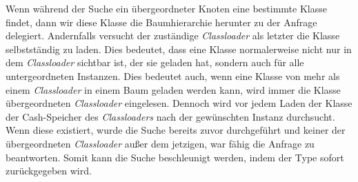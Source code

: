     Wenn während der Suche ein übergeordneter Knoten eine bestimmte Klasse findet, dann wir diese Klasse die Baumhierarchie herunter zu der Anfrage delegiert. Andernfalls versucht der zuständige \textit{Classloader} als letzter die Klasse selbstständig zu laden.
    Dies bedeutet, dass eine Klasse normalerweise nicht nur in dem \textit{Classloader} sichtbar ist, der sie geladen hat, sondern auch für alle untergeordneten Instanzen. Dies bedeutet auch, wenn eine Klasse von mehr als einem \textit{Classloader} in einem Baum geladen werden kann, wird immer die Klasse übergeordneten \textit{Classloader} eingelesen. \newline
    Dennoch wird vor jedem Laden der Klasse der Cash-Speicher des \textit{Classloaders} nach der gewünschten Instanz durchsucht. Wenn diese existiert, wurde die Suche bereits zuvor durchgeführt und keiner der übergeordneten \textit{Classloader} außer dem jetzigen, war fähig die Anfrage zu beantworten. Somit kann die Suche beschleunigt werden, indem der Type sofort zurückgegeben wird.

